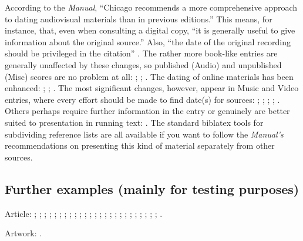 \documentclass[a4paper,12pt]{report}
\begin{document}
According to the \emph{Manual}, \enquote{Chicago recommends a more
  comprehensive approach to dating audiovisual materials than in
  previous editions.}  This means, for instance, that, even when
consulting a digital copy, \enquote{it is generally useful to give
  information about the original source.}  Also, \enquote{the date of
  the original recording should be privileged in the citation}
\autocite[15.53]{chicago:manual}.  The rather more book-like entries
are generally unaffected by these changes, so published
(\textsf{Audio}) and unpublished (\textsf{Misc}) scores are no problem
at all: \autocite{schubert:muellerin}; \autocite{verdi:corsaro};
\autocite{shapey:partita:15}.  The dating of online materials has been
enhanced: \autocite{coolidge:speech}; \autocite{horowitz:youtube};
\autocite{pollan:plant}.  The most significant changes, however,
appear in \textsf{Music} and \textsf{Video} entries, where every
effort should be made to find date(s) for sources:
\autocite{auden:reading}; \autocite{friends:leia};
\autocite{handel:messiah}; \autocite{holiday:fool};
\autocite{nytrumpet:art}.  Others perhaps require further information
in the entry or genuinely are better suited to presentation in running
text: \autocite{beethoven:sonata29}.  The standard \textsf{biblatex}
tools for subdividing reference lists are all available if you want to
follow the \emph{Manual's} recommendations on presenting this kind of
material separately from other sources.

\subsection*{Further examples (mainly for testing purposes)}
\label{testing}

Article: \autocite{assocpress:gun}; \autocite{brown:bremer};
\autocite{chu:panda}; \autocite{conley:fifthgrade};
\autocite{connell:chronic}; \autocite{ellis:blog};
\autocite{friedman:learning}; \autocite{garaud:gatine};
\autocite{garrett:15}; \autocite{gibbard:15}; \autocite{kern};
\autocite{kimluu:diethyl:15}; \autocite{lewis:15};
\autocite{loften:hamlet}; \autocite{loomis:structure:15};
\autocite{morgenson:market}; \autocite{osborne:poison:15};
\autocite{reaves:rosen}; \autocite{rozner:liberation};
\autocite{schneider:mittelpleistozaene}; \autocite{sewall:letter};
\autocite{stenger:privacy}; \autocite{terborgh:preservation};
\autocite{wall:radio}; \autocite{warr:ellison};
\autocite{white:callimachus}.

Artwork: \autocite{leo:madonna}.
\end{document}
